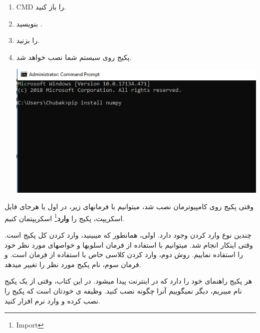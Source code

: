 \documentclass[14pt,a4paper]{memoir}
\begin{document}
	 \begin{enumerate}
	 	\item CMD را باز کنید.
	 	\item بنویسید .
	 	\item \keys{\return} را بزنید.
	 	\item پکیج روی سیستم شما نصب خواهد شد.
	 	\begin{center}
	 		\includegraphics[scale=0.8]{pip_1}
	 	\end{center}
	 \end{enumerate}  
	 
	 
	 وقتی پکیج روی کامپیوترمان نصب شد، میتوانیم با فرمانهای زیر، در اول یا هرجای فایل اسکریپت، پکیج را \textbf{وارد}\footnote{Import} اسکریپتمان کنیم.
	 
	 
	 
	 	 	 \begin{latin}
	 	
	 \end{latin}
 
 چندین نوع وارد کردن وجود دارد. اولی، همانطور که میبینید، وارد کردن کل پکیج است. وقتی اینکار انجام شد. میتوانیم با استفاده از فرمان  اسلوبها و خواصهای مورد نظر خود را استفاده نماییم. روش دوم، وارد کردن کلاسی خاص با استفاده از فرمان  است. و فرمان سوم، نام پکیج مورد نظر را تغییر میدهد. 
	 
	 
	 هر پکیج راهنمای خود را دارد که در اینترنت پیدا میشود. در این کتاب، وقتی از یک پکیج نام میبریم، دیگر نمیگوییم آنرا چگونه نصب کنید. وظیفه ی خودتان است که پکیج را نصب کرده و وارد نرم افزار کنید.
	 
\end{document}
